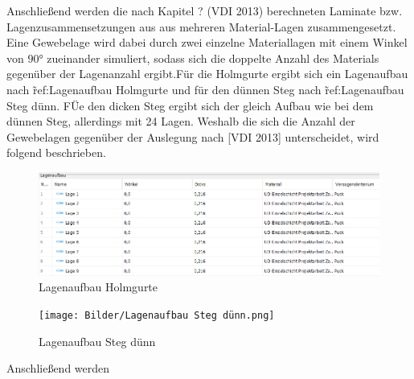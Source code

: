 \noindent Anschließend werden die nach Kapitel ? (VDI 2013) berechneten Laminate bzw. Lagenzusammensetzungen aus aus mehreren Material-Lagen zusammengesetzt. Eine Gewebelage wird dabei durch zwei einzelne Materiallagen mit einem Winkel von $90°$ zueinander simuliert, sodass sich die doppelte Anzahl des Materials gegenüber der Lagenanzahl ergibt.Für die Holmgurte ergibt sich ein Lagenaufbau nach \~{ref:Lagenaufbau Holmgurte} und für den dünnen Steg nach \~{ref:Lagenaufbau Steg dünn}. FÜe den dicken Steg ergibt sich der gleich Aufbau wie bei dem dünnen Steg, allerdings mit 24 Lagen. Weshalb die sich die Anzahl der Gewebelagen gegenüber der Auslegung nach [VDI 2013] unterscheidet, wird folgend beschrieben.\\ 

\begin{figure}
	\includegraphics[width=1.0\textwidth]{Bilder/Lagenaufbau Holmgurte.png}
	\caption{Lagenaufbau Holmgurte}
	\label{fig:Lagenaufbau Holmgurte}
\end{figure}
\begin{figure}
	\texttt{[image: Bilder/Lagenaufbau Steg dünn.png]}
	\caption{Lagenaufbau Steg dünn}
	\label{fig:Lagenaufbau Steg dünn}
\end{figure}
\noindent Anschließend werden 